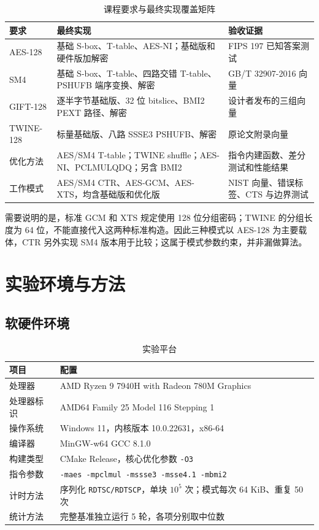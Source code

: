 \documentclass[a4paper,12pt]{ctexart}
\begin{document}
\begin{table}[H]
\centering
\small
\caption{课程要求与最终实现覆盖矩阵}
\begin{tabularx}{\textwidth}{p{2.7cm}YY}
\toprule
要求 & 最终实现 & 验收证据\\
\midrule
AES-128 & 基础 S-box、T-table、AES-NI；基础版和硬件版加解密 & FIPS 197 已知答案测试\\
SM4 & 基础 S-box、T-table、四路交错 T-table、PSHUFB 端序变换、解密 & GB/T 32907-2016 向量\\
GIFT-128 & 逐半字节基础版、32 位 bitslice、BMI2 PEXT 路径、解密 & 设计者发布的三组向量\\
TWINE-128 & 标量基础版、八路 SSSE3 PSHUFB、解密 & 原论文附录向量\\
优化方法 & AES/SM4 T-table；TWINE shuffle；AES-NI、PCLMULQDQ；另含 BMI2 & 指令内建函数、差分测试和性能结果\\
工作模式 & AES/SM4 CTR、AES-GCM、AES-XTS，均含基础版和优化版 & NIST 向量、错误标签、CTS 与边界测试\\
\bottomrule
\end{tabularx}
\end{table}

需要说明的是，标准 GCM 和 XTS 规定使用 128 位分组密码；TWINE 的分组长度为 64 位，不能直接代入这两种标准构造。因此三种模式以 AES-128 为主要载体，CTR 另外实现 SM4 版本用于比较；这属于模式参数约束，并非漏做算法。

\section{实验环境与方法}

\subsection{软硬件环境}

\begin{table}[H]
\centering
\caption{实验平台}
\begin{tabularx}{0.92\textwidth}{p{4.0cm}Y}
\toprule
项目 & 配置\\
\midrule
处理器 & AMD Ryzen 9 7940H with Radeon 780M Graphics\\
处理器标识 & AMD64 Family 25 Model 116 Stepping 1\\
操作系统 & Windows 11，内核版本 10.0.22631，x86-64\\
编译器 & MinGW-w64 GCC 8.1.0\\
构建类型 & CMake Release，核心优化参数 \texttt{-O3}\\
指令参数 & \texttt{-maes -mpclmul -mssse3 -msse4.1 -mbmi2}\\
计时方法 & 序列化 \texttt{RDTSC/RDTSCP}，单块 $10^5$ 次；模式每次 64 KiB、重复 50 次\\
统计方法 & 完整基准独立运行 5 轮，各项分别取中位数\\
\bottomrule
\end{tabularx}
\end{table}
\end{document}
